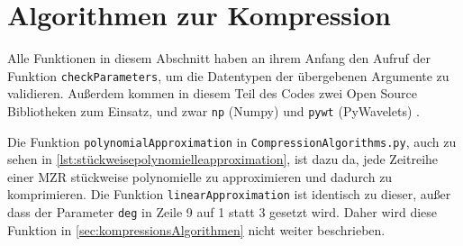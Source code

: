 \section{Algorithmen zur Kompression}\label{sec:kompressionsAlgorithmen}
Alle Funktionen in diesem Abschnitt haben an ihrem Anfang den Aufruf der Funktion \lstinline|checkParameters|, um die Datentypen der übergebenen Argumente zu validieren. Außerdem kommen in diesem Teil des Codes zwei Open Source Bibliotheken zum Einsatz, und zwar \lstinline|np| (Numpy) \cite{numpy} und \lstinline|pywt| (PyWavelets) \cite{pyWavelets}.

Die Funktion \lstinline|polynomialApproximation| in \texttt{CompressionAlgorithms.py}, auch zu sehen in \autoref{lst:stückweisepolynomielleapproximation}, ist dazu da, jede Zeitreihe einer \ac{MZR} stückweise polynomielle zu approximieren und dadurch zu komprimieren. Die Funktion \lstinline|linearApproximation| ist identisch zu dieser, außer dass der Parameter \lstinline|deg| in Zeile 9 auf 1 statt 3 gesetzt wird. Daher wird diese Funktion in \autoref{sec:kompressionsAlgorithmen} nicht weiter beschrieben.

